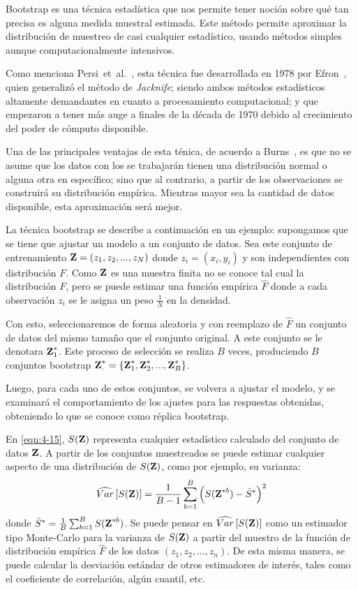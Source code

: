 Bootstrap es una técnica estadística que nos permite tener noción sobre qué tan precisa es alguna medida muestral estimada. Este método permite aproximar la distribución de muestreo de casi cualquier estadístico, usando métodos simples aunque computacionalmente intensivos. 

Como menciona Persi~et~al.~\cite{Diaconis1983}, esta técnica fue desarrollada en 1978 por Efron~\cite{Efron1978}, quien generalizó el método de \textit{Jacknife}; siendo ambos métodos estadísticos altamente demandantes en cuanto a procesamiento computacional; y que empezaron a tener más auge a finales de la década de 1970 debido al crecimiento del poder de cómputo disponible.

Una de las principales ventajas de esta ténica, de acuerdo a Burns~\cite{Burns2013}, es que no se asume que los datos con los se trabajarán tienen una distribución normal o alguna otra en específico; sino que al contrario, a partir de los observaciones se construirá su distribución empírica. Mientras mayor sea la cantidad de datos disponible, esta aproximación será mejor.

La técnica bootstrap se describe a continuación en un ejemplo: supongamos que se tiene que ajustar un modelo a un conjunto de datos. Sea este conjunto de entrenamiento $\textbf{Z} = (z_1, z_2, ..., z_N)$ donde $z_i = (x_i, y_i)$ y son independientes con distribución $F$. Como $\textbf{Z}$ es una muestra finita no se conoce tal cual la distribución $F$, pero se puede estimar una función empírica $\hat F$ donde a cada observación $z_i$ se le asigna un peso $\frac{1}{N}$ en la densidad.

Con esto, seleccionaremos de forma aleatoria y con reemplazo de $\hat{F}$ un conjunto de datos del mismo tamaño que el conjunto original. A este conjunto se le denotara $\textbf{Z}^{*}_1$. Este proceso de selección se realiza $B$ veces, produciendo $B$ conjuntos bootstrap $\textbf{Z}^{*}_{\cdot} = \lbrace \textbf{Z}^{*}_1, \textbf{Z}^{*}_2, ..., \textbf{Z}^{*}_B \rbrace$. 

Luego, para cada uno de estos conjuntos, se volvera a ajustar el modelo, y se examinará el comportamiento de los ajustes para las respuestas obtenidas, obteniendo lo que se conoce como réplica bootstrap.

En \eqref{eqn:4-15}, $S(\textbf{Z})$ representa cualquier estadístico calculado del conjunto de datos $\textbf{Z}$. A partir de los conjuntos muestreados se puede estimar cualquier aspecto de una distribución de $S(\textbf{Z})$, como por ejemplo, su varianza: 
\begin{equation}
\widehat{Var} \left[ S(\textbf{Z}) \right] = \frac{1}{B-1} \sum_{b=1}^B \left( S(\textbf{Z}^{*b}) - \bar{S}^{*} \right)^2
\label{eqn:4-15}
\end{equation}
donde $\bar{S}^{*} = \frac{1}{B} \sum_{b=1}^B S(\textbf{Z}^{*b})$. Se puede pensar en $\widehat{Var} \left[ S(\textbf{Z}) \right]$ como un estimador tipo Monte-Carlo para la varianza de $S(\textbf{Z})$ a partir del muestro de la función de distribución empírica $\widehat{F}$ de los datos $(z_1, z_2, ..., z_n)$. De esta misma manera, se puede calcular la desviación estándar de otros estimadores de interés, tales como el coeficiente de correlación, algún cuantil, etc.

